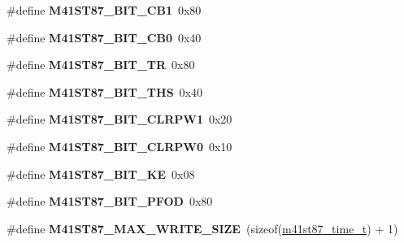 \begin{DoxyCompactItemize}
\item 
\mbox{\label{arm_2altera-cyclone-v_2rtc_2rtc_8c_a92ccea83ed766ef43b80e487cd87d425}} 
\#define {\bfseries M41\+S\+T87\+\_\+\+B\+I\+T\+\_\+\+C\+B1}~0x80
\item 
\mbox{\label{arm_2altera-cyclone-v_2rtc_2rtc_8c_a911d5ed55de705a2c7a6b873b28bf722}} 
\#define {\bfseries M41\+S\+T87\+\_\+\+B\+I\+T\+\_\+\+C\+B0}~0x40
\item 
\mbox{\label{arm_2altera-cyclone-v_2rtc_2rtc_8c_abd985da5bc78e957ab22d0bcc0c7a190}} 
\#define {\bfseries M41\+S\+T87\+\_\+\+B\+I\+T\+\_\+\+TR}~0x80
\item 
\mbox{\label{arm_2altera-cyclone-v_2rtc_2rtc_8c_af50184597b496879c761c7970e4f04f3}} 
\#define {\bfseries M41\+S\+T87\+\_\+\+B\+I\+T\+\_\+\+T\+HS}~0x40
\item 
\mbox{\label{arm_2altera-cyclone-v_2rtc_2rtc_8c_a55942be154cf45560c42f30e097d40e8}} 
\#define {\bfseries M41\+S\+T87\+\_\+\+B\+I\+T\+\_\+\+C\+L\+R\+P\+W1}~0x20
\item 
\mbox{\label{arm_2altera-cyclone-v_2rtc_2rtc_8c_aa0941938d99a9512d32b5dd6a17a64de}} 
\#define {\bfseries M41\+S\+T87\+\_\+\+B\+I\+T\+\_\+\+C\+L\+R\+P\+W0}~0x10
\item 
\mbox{\label{arm_2altera-cyclone-v_2rtc_2rtc_8c_abd72549b9ee73e6c4fd2327965333154}} 
\#define {\bfseries M41\+S\+T87\+\_\+\+B\+I\+T\+\_\+KE}~0x08
\item 
\mbox{\label{arm_2altera-cyclone-v_2rtc_2rtc_8c_a741c1010b1fd8f6945741e71be3ab299}} 
\#define {\bfseries M41\+S\+T87\+\_\+\+B\+I\+T\+\_\+\+P\+F\+OD}~0x80
\item 
\mbox{\label{arm_2altera-cyclone-v_2rtc_2rtc_8c_a9e99cbb861d57a5971436e707138827e}} 
\#define {\bfseries M41\+S\+T87\+\_\+\+M\+A\+X\+\_\+\+W\+R\+I\+T\+E\+\_\+\+S\+I\+ZE}~(sizeof(\mbox{\hyperlink{structm41st87__time__t}{m41st87\+\_\+time\+\_\+t}}) + 1)
\end{DoxyCompactItemize}
